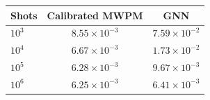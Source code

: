 \begin{tabular}{lcc}
\toprule
Shots & Calibrated MWPM & GNN \\
\midrule
$10^{3}$ & $8.55\times10^{-3}$ & $7.59\times10^{-2}$ \\
$10^{4}$ & $6.67\times10^{-3}$ & $1.73\times10^{-2}$ \\
$10^{5}$ & $6.28\times10^{-3}$ & $9.67\times10^{-3}$ \\
$10^{6}$ & $6.25\times10^{-3}$ & $6.41\times10^{-3}$ \\
\bottomrule
\end{tabular}
